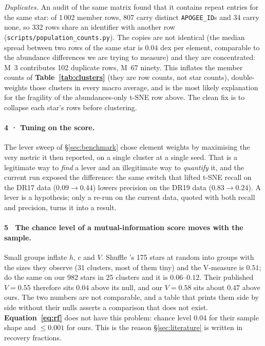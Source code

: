 \emph{Duplicates.} An audit of the same matrix found that it contains repeat
entries for the same star: of 1\,002 member rows, 807 carry distinct
\texttt{APOGEE\_ID}s and 34 carry none, so 332 rows share an identifier with
another row (\texttt{scripts/population\_counts.py}). The copies are not
identical (the median spread between two rows of the same star is $0.04$ dex
per element, comparable to the abundance differences we are trying to measure)
and they are concentrated: M~3 contributes 102 duplicate rows, M~67 ninety.
This inflates the member counts of \textbf{Table~\ref{tab:clusters}} (they are
row counts, not star counts), double-weights those clusters in every macro
average, and is the most likely explanation for the fragility of the
abundances-only t-SNE row above. The clean fix is to collapse each star's rows
before clustering.

\paragraph{4 · Tuning on the score.} The lever sweep of
\S\ref{sec:benchmark} chose element weights by maximising the very metric it
then reported, on a single cluster at a single seed. That is a legitimate way
to \emph{find} a lever and an illegitimate way to \emph{quantify} it, and the
current run exposed the difference: the same switch that lifted t-SNE recall
on the DR17 data ($0.09 \rightarrow 0.44$) lowers precision on the DR19 data
($0.83 \rightarrow 0.24$). A lever is a hypothesis; only a re-run on the
current data, quoted with both recall and precision, turns it into a result.

\paragraph{5 \textperiodcentered\ The chance level of a mutual-information
score moves with the sample.} Small groups inflate $h$, $c$ and $V$. Shuffle
\citet{Casamiquela:21}'s 175 stars at random into groups with the sizes they
observe (31 clusters, most of them tiny) and the V-measure is $0.51$; do the
same on our 982 stars in 25 clusters and it is $0.06$--$0.12$. Their published
$V = 0.55$ therefore sits $0.04$ above its null, and our $V = 0.58$ sits about
$0.47$ above ours. The two numbers are not comparable, and a table that prints
them side by side without their nulls asserts a comparison that does not exist.
\textbf{Equation~\ref{eq:rf}} does not have this problem: chance level $0.04$
for their sample shape and $\le 0.001$ for ours. This is the reason
\S\ref{sec:literature} is written in recovery fractions.

